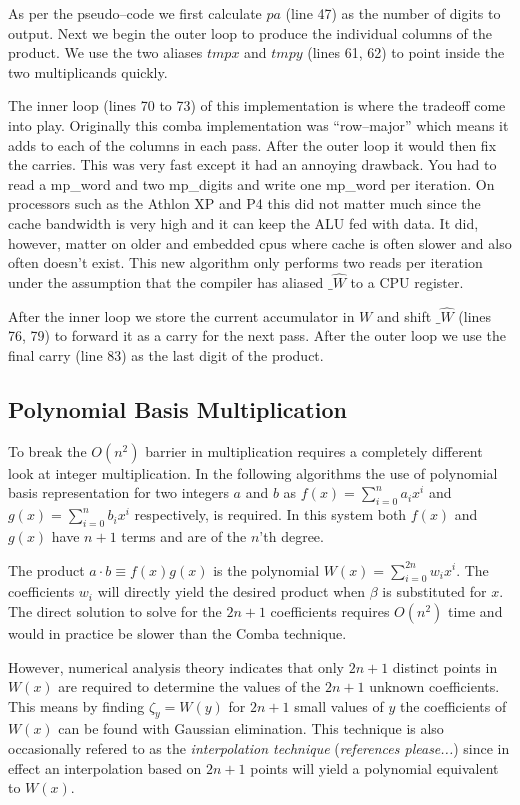 \documentclass[b5paper]{book}
\begin{document}
As per the pseudo--code we first calculate $pa$ (line 47) as the number of digits to output.  Next we begin the outer loop
to produce the individual columns of the product.  We use the two aliases $tmpx$ and $tmpy$ (lines 61, 62) to point
inside the two multiplicands quickly.  

The inner loop (lines 70 to 73) of this implementation is where the tradeoff come into play.  Originally this comba 
implementation was ``row--major'' which means it adds to each of the columns in each pass.  After the outer loop it would then fix 
the carries.  This was very fast except it had an annoying drawback.  You had to read a mp\_word and two mp\_digits and write 
one mp\_word per iteration.  On processors such as the Athlon XP and P4 this did not matter much since the cache bandwidth 
is very high and it can keep the ALU fed with data.  It did, however, matter on older and embedded cpus where cache is often 
slower and also often doesn't exist.  This new algorithm only performs two reads per iteration under the assumption that the 
compiler has aliased $\_ \hat W$ to a CPU register.

After the inner loop we store the current accumulator in $W$ and shift $\_ \hat W$ (lines 76, 79) to forward it as 
a carry for the next pass.  After the outer loop we use the final carry (line 83) as the last digit of the product.  

\subsection{Polynomial Basis Multiplication}
To break the $O(n^2)$ barrier in multiplication requires a completely different look at integer multiplication.  In the following algorithms
the use of polynomial basis representation for two integers $a$ and $b$ as $f(x) = \sum_{i=0}^{n} a_i x^i$ and  
$g(x) = \sum_{i=0}^{n} b_i x^i$ respectively, is required.  In this system both $f(x)$ and $g(x)$ have $n + 1$ terms and are of the $n$'th degree.
 
The product $a \cdot b \equiv f(x)g(x)$ is the polynomial $W(x) = \sum_{i=0}^{2n} w_i x^i$.  The coefficients $w_i$ will
directly yield the desired product when $\beta$ is substituted for $x$.  The direct solution to solve for the $2n + 1$ coefficients
requires $O(n^2)$ time and would in practice be slower than the Comba technique.

However, numerical analysis theory indicates that only $2n + 1$ distinct points in $W(x)$ are required to determine the values of the $2n + 1$ unknown 
coefficients.   This means by finding $\zeta_y = W(y)$ for $2n + 1$ small values of $y$ the coefficients of $W(x)$ can be found with 
Gaussian elimination.  This technique is also occasionally refered to as the \textit{interpolation technique} (\textit{references please...}) since in 
effect an interpolation based on $2n + 1$ points will yield a polynomial equivalent to $W(x)$.  
\end{document}
